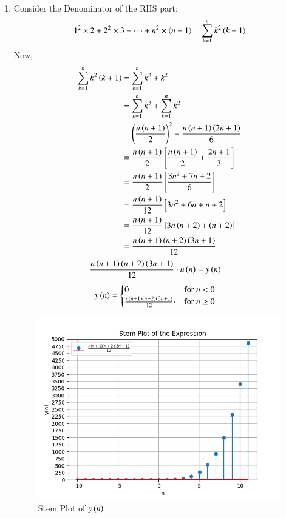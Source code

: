 \documentclass[journal,12pt,twocolumn]{IEEEtran}
\theoremstyle{remark}
\begin{document}
\begin{enumerate}
\item Consider the Denominator of the RHS part:
\begin{equation}
    1^2\times2 + 2^2\times3 +\dots + n^2\times\left(n+1\right) = \sum_{k=1}^n k^2\left(k+1\right)
\end{equation}
Now,
\begin{align}
     \sum_{k=1}^n k^2\left(k+1\right) &= \sum_{k=1}^n k^3+k^2\\
                           &=  \sum_{k=1}^n k^3 + \sum_{k=1}^n k^2\\
                           &=  \left(\frac{n\left(n+1\right)}{2}\right)^{\scriptstyle 2}+\frac{n\left(n+1\right)\left(2n+1\right)}{6}\\ 
                           &= \frac{n\left(n+1\right)}{2}\left[\frac{n\left(n+1\right)}{2} +\frac{2n+1}{3}\right]\\
                           &= \frac{n\left(n+1\right)}{2}\left[\frac{3n^2+7n+2}{6}\right]\\
                           &= \frac{n\left(n+1\right)}{12}\left[3n^2+6n + n+2\right]\\
                           &= \frac{n\left(n+1\right)}{12}\left[3n\left(n+2\right)+\left(n+2\right)\right]\\
                           &= \frac{n\left(n+1\right)\left(n+2\right)\left(3n+1\right)}{12}
\end{align}
\begin{align}
    \frac{n\left(n+1\right)\left(n+2\right)\left(3n+1\right)}{12}\cdot u\left(n\right) &= y\left(n\right)
\end{align}
\begin{align}
     y\left(n\right) & = \begin{cases}
        0 & \text{for } n < 0 \\
        \frac{n\left(n+1\right)\left(n+2\right)\left(3n+1\right)}{12}\cdot& \text{for } n \geq 0
    \end{cases}
\end{align}
\begin{figure}[h]
    \centering
    \includegraphics[width=\columnwidth]{Figure_2.png}
    \caption{Stem Plot of $y\left(n\right)$}
\end{figure}
\vspace{1cm}


\end{enumerate}
\end{document}
